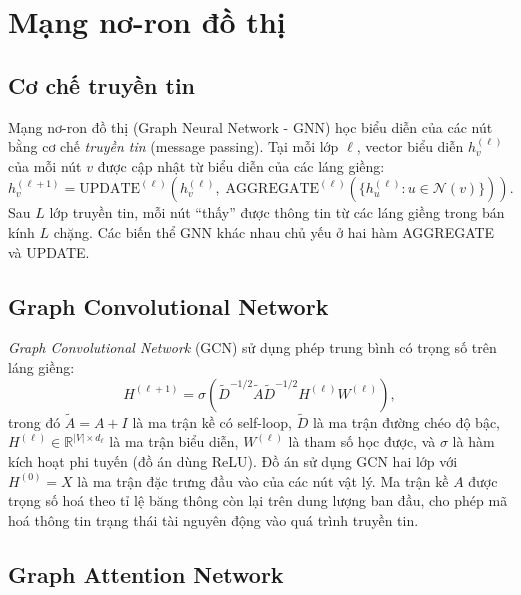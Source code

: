 \documentclass[../DoAn.tex]{subfiles}
\begin{document}
\section{Mạng nơ-ron đồ thị}
\label{sec:gnn}

\subsection{Cơ chế truyền tin}

Mạng nơ-ron đồ thị (Graph Neural Network - GNN) học biểu diễn của các nút bằng cơ chế \textit{truyền tin} (message passing). Tại mỗi lớp $\ell$, vector biểu diễn $h_v^{(\ell)}$ của mỗi nút $v$ được cập nhật từ biểu diễn của các láng giềng:
\begin{equation}
    h_v^{(\ell+1)} = \text{UPDATE}^{(\ell)}\left( h_v^{(\ell)},\; \text{AGGREGATE}^{(\ell)}\left( \{h_u^{(\ell)} : u \in \mathcal{N}(v)\} \right) \right).
\end{equation}
Sau $L$ lớp truyền tin, mỗi nút ``thấy'' được thông tin từ các láng giềng trong bán kính $L$ chặng. Các biến thể GNN khác nhau chủ yếu ở hai hàm AGGREGATE và UPDATE.

\subsection{Graph Convolutional Network}

\textit{Graph Convolutional Network} (GCN)\cite{kipf2017gcn} sử dụng phép trung bình có trọng số trên láng giềng:
\begin{equation}
    H^{(\ell+1)} = \sigma\left( \tilde{D}^{-1/2} \tilde{A} \tilde{D}^{-1/2} H^{(\ell)} W^{(\ell)} \right),
    \label{eq:gcn}
\end{equation}
trong đó $\tilde{A} = A + I$ là ma trận kề có self-loop, $\tilde{D}$ là ma trận đường chéo độ bậc, $H^{(\ell)} \in \mathbb{R}^{|V| \times d_\ell}$ là ma trận biểu diễn, $W^{(\ell)}$ là tham số học được, và $\sigma$ là hàm kích hoạt phi tuyến (đồ án dùng ReLU). Đồ án sử dụng GCN hai lớp với $H^{(0)} = X$ là ma trận đặc trưng đầu vào của các nút vật lý. Ma trận kề $A$ được trọng số hoá theo tỉ lệ băng thông còn lại trên dung lượng ban đầu, cho phép mã hoá thông tin trạng thái tài nguyên động vào quá trình truyền tin.

\subsection{Graph Attention Network}
\end{document}
